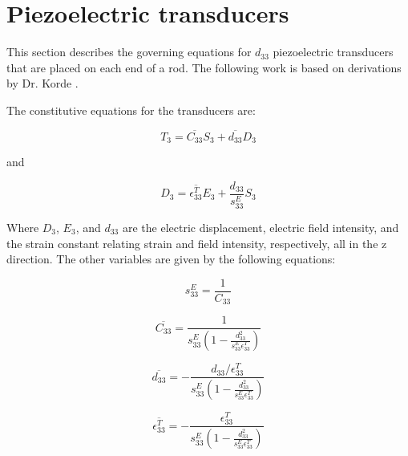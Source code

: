 \section{Piezoelectric transducers}

This section describes the governing equations for $d_{33}$ piezoelectric transducers that are placed on each end of a rod. The following work is based on derivations by Dr. Korde \cite{Fehrman2012}.

The constitutive equations for the transducers are:

\begin{equation}
T_3 = \overline{C_{33}} S_3 + \overline{d_{33}} D_3
\end{equation}

and 

\begin{equation}
D_3 = \overline{\epsilon ^T_{33}} E_3 + \frac{d_{33}}{s^E_{33}} S_3
\end{equation}


Where $D_3$, $E_3$, and $d_{33}$ are the electric displacement, electric field intensity, and the strain constant relating strain and field intensity, respectively, all in the z direction. The other variables are given by the following equations:

\begin{equation}
s^E_{33} = \frac{1}{C_{33}}
\end{equation}

\begin{equation}
\overline{C_{33}} = \frac{1}{s^E_{33}\left( 1 - \frac{d^2_{33}}{s^E_{33}\epsilon ^T_{33}}\right)}
\end{equation}

\begin{equation}
\overline{d_{33}} = -\frac{d_{33} / \epsilon ^T_{33}}{s^E_{33}\left(1 - \frac{d^2_{33}}{s^E_{33}\epsilon ^T_{33}}\right)}
\end{equation}

\begin{equation}
\overline{\epsilon ^T_{33}} = -\frac{\epsilon ^T_{33}}{s^E_{33}\left(1 - \frac{d^2_{33}}{s^E_{33}\epsilon ^T_{33}}\right)}
\end{equation}


